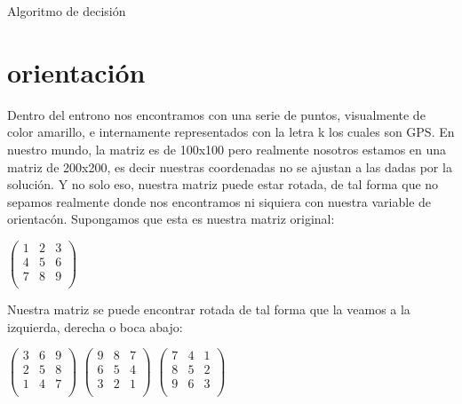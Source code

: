 \documentclass[10pt,a4paper,spanish]{article}
\begin{document}
\bigskip
\begin{algorithm}[H]
\SetAlgoLined
\caption{Algoritmo de decisión}
\end{algorithm}

\bigskip



\bigskip


\section{orientación}

Dentro del entrono nos encontramos con una serie de puntos, visualmente de color amarillo, e internamente representados con la letra k los cuales son GPS. En nuestro mundo, la matriz es de 100x100 pero realmente nosotros estamos en una matriz de 200x200, es decir nuestras coordenadas no se ajustan a las dadas por la solución. Y no solo eso, nuestra matriz puede estar rotada, de tal forma que no sepamos realmente donde nos encontramos ni siquiera con nuestra variable de orientacón. Supongamos que esta es nuestra matriz original:
\bigskip

$
\begin{pmatrix}
1 & 2 & 3 \\
4 & 5 & 6 \\
7 & 8 & 9 \\
\end{pmatrix}
$


Nuestra matriz se puede encontrar rotada de tal forma que la veamos a la izquierda, derecha o boca abajo:

$
\begin{pmatrix}
3 & 6 & 9 \\
2 & 5 & 8 \\
1 & 4 & 7 \\
\end{pmatrix}
$
$
\begin{pmatrix}
9 & 8 & 7 \\
6 & 5 & 4 \\
3 & 2 & 1 \\
\end{pmatrix}
$
$
\begin{pmatrix}
7 & 4 & 1 \\
8 & 5 & 2 \\
9 & 6 & 3 \\
\end{pmatrix}
$
\end{document}
